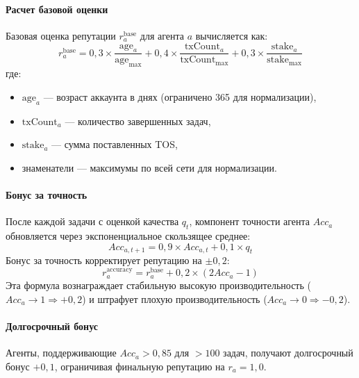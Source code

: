 \documentclass[11pt]{article}
\begin{document}
\paragraph{Расчет базовой оценки} Базовая оценка репутации $r_a^{\text{base}}$ для агента $a$ вычисляется как:
\begin{equation}
r_a^{\text{base}} = 0,3 \times \frac{\text{age}_a}{\text{age}_{\max}} + 0,4 \times \frac{\text{txCount}_a}{\text{txCount}_{\max}} + 0,3 \times \frac{\text{stake}_a}{\text{stake}_{\max}}
\end{equation}
где:
\begin{itemize}[noitemsep]
  \item $\text{age}_a$ — возраст аккаунта в днях (ограничено 365 для нормализации),
  \item $\text{txCount}_a$ — количество завершенных задач,
  \item $\text{stake}_a$ — сумма поставленных TOS,
  \item знаменатели — максимумы по всей сети для нормализации.
\end{itemize}

\paragraph{Бонус за точность} После каждой задачи с оценкой качества $q_t$, компонент точности агента $Acc_a$ обновляется через экспоненциальное скользящее среднее:
\begin{equation}
Acc_{a,t+1} = 0,9 \times Acc_{a,t} + 0,1 \times q_t
\end{equation}
Бонус за точность корректирует репутацию на $\pm 0,2$:
\begin{equation}
r_a^{\text{accuracy}} = r_a^{\text{base}} + 0,2 \times (2 Acc_a - 1)
\end{equation}
Эта формула вознаграждает стабильную высокую производительность ($Acc_a \to 1 \Rightarrow +0,2$) и штрафует плохую производительность ($Acc_a \to 0 \Rightarrow -0,2$).

\paragraph{Долгосрочный бонус} Агенты, поддерживающие $Acc_a > 0,85$ для $>100$ задач, получают долгосрочный бонус $+0,1$, ограничивая финальную репутацию на $r_a = 1,0$.
\end{document}
